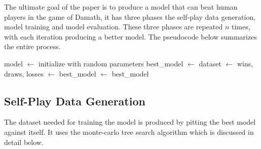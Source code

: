 The ultimate goal of the paper is to produce a model that can beat human players in the game of Damath, it has three phases the self-play data generation, model training and model evaluation. These three phases are repeated $n$ times, with each iteration producing a better model. The pseudocode below summarizes the entire process. 

\begin{algorithm}[htb]
    \begin{algorithmic}[1]
          \State model $\gets$ initialize with random parameters
          \State best\_model $\gets$ 
          \Repeat
            \State dataset $\gets$ 
            \State {}
            \State wins, draws, losses $\gets$ 
                \State best\_model $\gets$ 
            \EndIf
           \State \Return best\_model
        \EndFunction
    \end{algorithmic}
\end{algorithm}


\subsection{Self-Play Data Generation}

The dataset needed for training the model is produced by pitting the best model against itself. It uses the monte-carlo tree search algorithm which is discussed in detail below.

